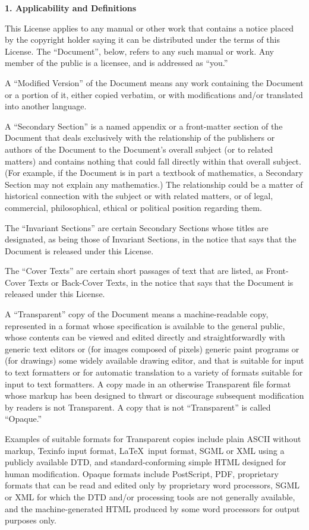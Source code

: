 \documentclass{doc}
\begin{document}
\noindent\textbf{1. Applicability and Definitions}

This License applies to any manual or other work that contains a
notice placed by the copyright holder saying it can be distributed
under the terms of this License.  The ``Document'', below, refers to any
such manual or work.  Any member of the public is a licensee, and is
addressed as ``you.''

A ``Modified Version'' of the Document means any work containing the
Document or a portion of it, either copied verbatim, or with
modifications and/or translated into another language.

A ``Secondary Section'' is a named appendix or a front-matter section of
the Document that deals exclusively with the relationship of the
publishers or authors of the Document to the Document's overall subject
(or to related matters) and contains nothing that could fall directly
within that overall subject.  (For example, if the Document is in part a
textbook of mathematics, a Secondary Section may not explain any
mathematics.)  The relationship could be a matter of historical
connection with the subject or with related matters, or of legal,
commercial, philosophical, ethical or political position regarding
them.

The ``Invariant Sections'' are certain Secondary Sections whose titles
are designated, as being those of Invariant Sections, in the notice
that says that the Document is released under this License.

The ``Cover Texts'' are certain short passages of text that are listed,
as Front-Cover Texts or Back-Cover Texts, in the notice that says that
the Document is released under this License.

A ``Transparent'' copy of the Document means a machine-readable copy,
represented in a format whose specification is available to the
general public, whose contents can be viewed and edited directly and
straightforwardly with generic text editors or (for images composed of
pixels) generic paint programs or (for drawings) some widely available
drawing editor, and that is suitable for input to text formatters or
for automatic translation to a variety of formats suitable for input
to text formatters.  A copy made in an otherwise Transparent file
format whose markup has been designed to thwart or discourage
subsequent modification by readers is not Transparent.  A copy that is
not ``Transparent'' is called ``Opaque.''

Examples of suitable formats for Transparent copies include plain
ASCII without markup, Texinfo input format, \LaTeX~input format, SGML
or XML using a publicly available DTD, and standard-conforming simple
HTML designed for human modification.  Opaque formats include
PostScript, PDF, proprietary formats that can be read and edited only
by proprietary word processors, SGML or XML for which the DTD and/or
processing tools are not generally available, and the
machine-generated HTML produced by some word processors for output
purposes only.
\end{document}
